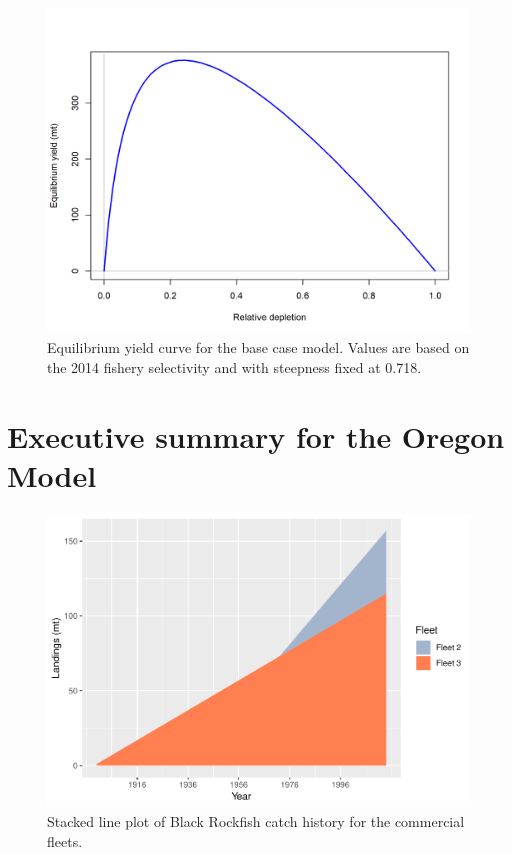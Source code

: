 \documentclass[12pt,]{article}
\begin{document}
\begin{figure}[htbp]
\centering
\includegraphics{r4ss/plots_mod1/yield1_yield_curve.png}
\caption{Equilibrium yield curve for the base case model. Values are
based on the 2014 fishery selectivity and with steepness fixed at 0.718.
\label{fig:Yield_all}}
\end{figure}

\FloatBarrier

\newpage

\section*{Executive summary for the Oregon
Model}\label{executive-summary-for-the-oregon-model}

\FloatBarrier

\begin{figure}[htbp]
\centering
\includegraphics{00_Assessment_Compile_files/figure-latex/unnamed-chunk-13-1.pdf}
\caption{Stacked line plot of Black Rockfish catch history for the
commercial fleets. \label{fig:Exec_catch2}}
\end{figure}
\end{document}
